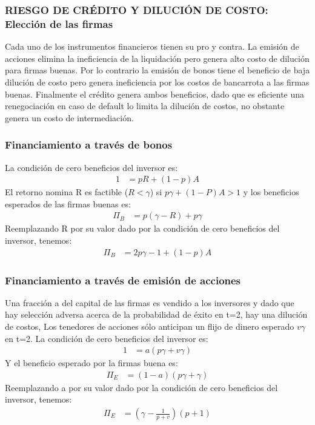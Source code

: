 \begin{frame}
\frametitle{{\normalsize RIESGO DE CRÉDITO Y DILUCIÓN DE COSTO: Elección de las firmas} {}}
 
Cada uno de los instrumentos financieros tienen su pro y contra. La emisión de acciones elimina la ineficiencia de la liquidación pero genera alto costo de dilución para firmas buenas. Por lo contrario la emisión de bonos tiene el beneficio de baja dilución de costo pero genera ineficiencia por los costos de bancarrota a las firmas buenas. Finalmente el crédito genera ambos beneficios, dado que es eficiente una renegociación en caso de default lo limita la dilución de costos, no obstante genera un costo de intermediación.  

\end{frame}


\begin{frame}
    \frametitle{{\normalsize Financiamiento a través de bonos} {}}
     
     La condición de cero beneficios del inversor es:
     \begin{align}
    1&=pR+(1-p)A 
     \end{align}
    El retorno nomina R es factible ($R<\gamma$) si $p\gamma +(1-P)A>1$ y los beneficios esperados de las firmas buenas es:
    \begin{align}
     \Pi_{B}&=p(\gamma - R)+p\gamma
    \end{align}
    Reemplazando R por su valor dado por la condición de cero beneficios del inversor, tenemos:
    \begin{align}
    \Pi_{B}&=2p\gamma-1+(1-p)A
    \end{align}
\end{frame}

\begin{frame}
    \frametitle{{\normalsize Financiamiento a través de emisión de acciones} {}}
    Una fracción a del capital de las firmas es vendido a los inversores y dado que hay selección adversa acerca de la probabilidad de éxito en t=2, hay una dilución de costos, Los tenedores de acciones sólo anticipan un flijo de dinero esperado $v\gamma$ en t=2.
    La condición de cero beneficios del inversor es:
   \begin{align}
   1&=a(p\gamma+v\gamma)
   \end{align}
   Y el beneficio esperado por la firmas buena es:
   \begin{align}
   \Pi_{E}&=(1-a)(p\gamma+\gamma)
    \end{align}
   Reemplazando a por su valor dado por la condición de cero beneficios del inversor, tenemos:
   \begin{align}
   \Pi_{E}&=(\gamma-\frac{1}{p+v})(p+1)
   \end{align}
\end{frame}



